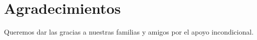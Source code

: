 \chapter*{Agradecimientos}

\noindent Queremos dar las gracias a nuestras familias y amigos por el apoyo incondicional.
